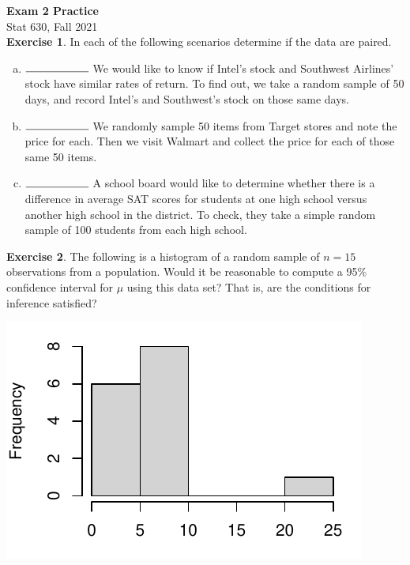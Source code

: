 \documentclass[fleqn, 11pt]{article}\usepackage[]{graphicx}\usepackage[]{color}
\makeatletter
\def\maxwidth{ %
  \ifdim\Gin@nat@width>\linewidth
    \linewidth
  \else
    \Gin@nat@width
  \fi
}
\newenvironment{knitrout}{}{} %
\makeatother
\begin{document}
\setlength\parindent{0pt}

\textbf{Exam 2 Practice}\\
Stat 630, Fall 2021\\

\textbf{Exercise 1}.  In each of the following scenarios determine if the data are paired.
\begin{enumerate}[(a)]
\item $\rule{2cm}{0.15mm}$ We would like to know if Intel's stock and Southwest Airlines' stock have similar rates of return. To find out, we take a random sample of 50 days, and record Intel's and Southwest's stock on those same days.
\item $\rule{2cm}{0.15mm}$ We randomly sample 50 items from Target stores and note the price for each. Then we visit Walmart and collect the price for each of those same 50
items.
\item $\rule{2cm}{0.15mm}$ A school board would like to determine whether there is a difference in average SAT scores for students at one high school versus another high school in the district. To check, they take a simple random sample of 100 students from each high school.\\
\end{enumerate}

\textbf{Exercise 2}.  The following is a histogram of a random sample of $n=15$ observations from a population.  Would it be reasonable to compute a 95\% confidence interval for $\mu$ using this data set?  That is, are the conditions for inference satisfied?

\begin{knitrout}
\color{fgcolor}
\includegraphics[width=\maxwidth]{figure/unnamed-chunk-1-1} 
\end{knitrout}
\end{document}
